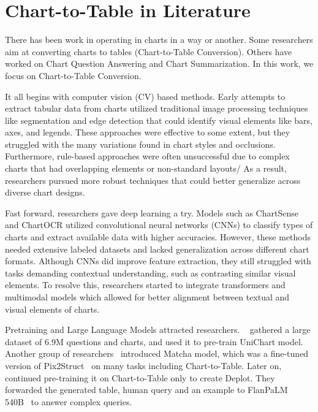 \documentclass[
	letterpaper, %
]{jdf}
\begin{document}
       \section{Chart-to-Table in Literature}\label{sect:literature}
       There has been work in operating in charts in a way or another.
       Some researchers aim at converting charts to tables (Chart-to-Table Conversion).
       Others have worked on Chart Question Answering and Chart Summarization.
       In this work, we focus on Chart-to-Table Conversion.

       It all begins with computer vision (CV) based methods. Early attempts to extract tabular data from charts utilized traditional image processing techniques like segmentation and edge detection that could identify visual elements like bars, axes, and legends. These approaches were effective to some extent, but they struggled with the many variations found in chart styles and occlusions. Furthermore, rule-based approaches were often unsuccessful due to complex charts that had overlapping elements or non-standard layouts/ As a result, researchers pursued more robust techniques that could better generalize across diverse chart designs. 

    Fast forward, researchers gave deep learning a try. Models such as ChartSense and ChartOCR utilized convolutional neural networks (CNNs) to classify types of charts and extract available data with higher accuracies. However, these methods needed extensive labeled datasets and lacked generalization across different chart formats. Although CNNs did improve feature extraction, they still struggled with tasks demanding contextual understanding, such as contrasting similar visual elements. To resolve this, researchers started to integrate transformers and multimodal models which allowed for better alignment between textual and visual elements of charts.
    
Pretraining and Large Language Models attracted researchers.
~\cite{masry2023unichart} gathered a large dataset of 6.9M questions and charts, and used it to pre-train UniChart model.
Another group of researchers~\cite{liu2022matcha} introduced Matcha model, which was a fine-tuned version of Pix2Struct~\cite{lee2023pix2struct} on many tasks including Chart-to-Table.
Later on,~\cite{liu2022deplot} continued pre-training it on Chart-to-Table only to create Deplot.
They forwarded the generated table, human query and an example to FlanPaLM 540B~\cite{chung2024scaling} to answer complex queries.
\end{document}
